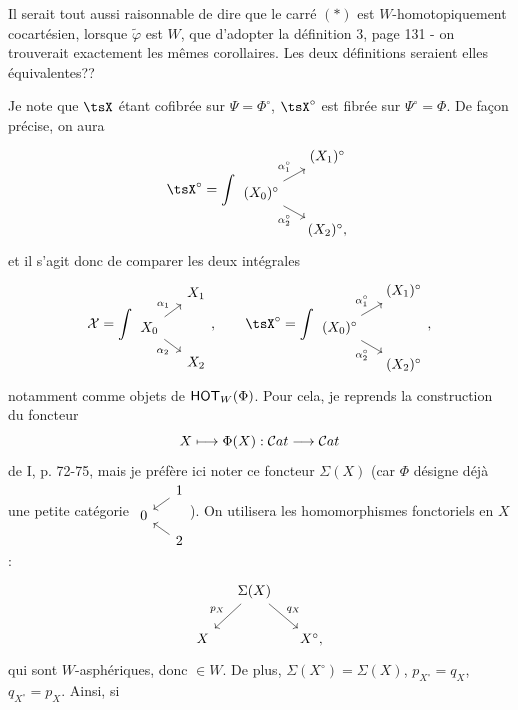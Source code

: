 Il serait tout aussi raisonnable de dire que le carré $(*)$ est $W$-homotopiquement cocartésien, lorsque $\tilde{\varphi}$ est $W$, que d'adopter la définition 3, page 131 - on trouverait exactement les mêmes corollaires. Les deux définitions seraient elles équivalentes?? %


Je note que $\tsX$ étant cofibrée sur $\Psi=\Phi^\circ$, $\tsX^\circ$ est fibrée sur $\Psi^\circ=\Phi$. De façon précise, on aura
\[
\tsX^\circ = \int
\begin{tikzcd}[row sep=small, column sep=small]
 & (X_1)^\circ \\
(X_0)^\circ \arrow[ur, "\alpha_1^\circ"] \arrow[dr, "\alpha_2^\circ"'] & \\
 & (X_2)^\circ,
\end{tikzcd}
\]
et il s'agit donc de comparer les deux intégrales
\[
\sX = \int
\begin{tikzcd}[row sep=small, column sep=small]
 & X_1 \\
X_0 \arrow[ur, "\alpha_1"] \arrow[dr, "\alpha_2"'] & \\
 & X_2
\end{tikzcd}
, \qquad
\tsX^\circ = \int
\begin{tikzcd}[row sep=small, column sep=small]
 & (X_1)^\circ \\
(X_0)^\circ \arrow[ur, "\alpha_1^\circ"] \arrow[dr, "\alpha_2^\circ"'] & \\
 & (X_2)^\circ
\end{tikzcd}
,
\]
notamment comme objets de $\mathsf{HOT}_W(\Phi)$. Pour cela, je reprends la construction du foncteur
\[
X \longmapsto \Phi(X) : \mathcal{C}at \longrightarrow \mathcal{C}at
\]
de I, p. 72-75, mais je préfère ici noter ce foncteur $\Sigma(X)$ (car $\Phi$ désigne déjà une petite catégorie $\begin{tikzcd}[row sep=tiny, column sep=small]
 & 1 \arrow[dl] \\
0 & \\
 & 2 \arrow[ul]
\end{tikzcd}$). On utilisera les homomorphismes fonctoriels en $X$ :
\[
\begin{tikzcd}[column sep=small]
 & \Sigma(X) \arrow[dl, "p_X"'] \arrow[dr, "q_X"] & \\
X & & X^\circ,
\end{tikzcd}
\]
qui sont $W$-asphériques, donc $\in W$. De plus, $\Sigma(X^\circ)=\Sigma(X)$, $p_{X^\circ}=q_X$, $q_{X^\circ}=p_X$. Ainsi, si
